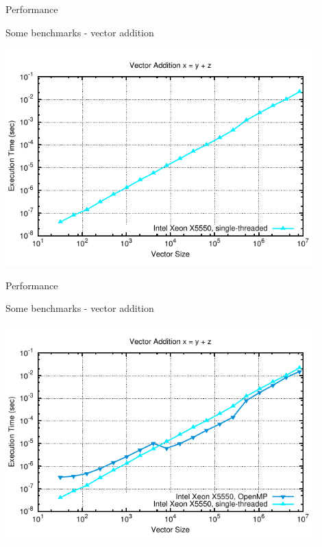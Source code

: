 \begin{frame}{Performance}
\begin{block}{Some benchmarks - vector addition}
  \begin{center}
   \includegraphics[width=0.9\textwidth]{figs/vector-timings-1}
  \end{center}
\end{block}
\end{frame}

\begin{frame}{Performance}
\begin{block}{Some benchmarks - vector addition}
  \begin{center}
   \includegraphics[width=0.9\textwidth]{figs/vector-timings-2}
  \end{center}
\end{block}
\end{frame}

